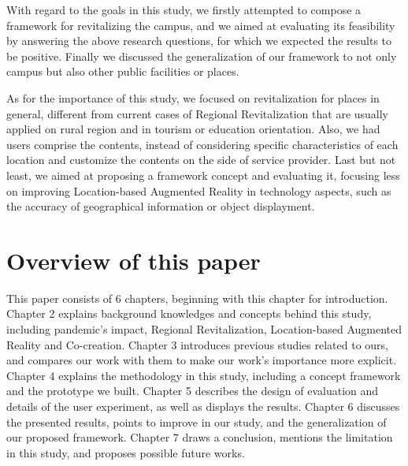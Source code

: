 
With regard to the goals in this study, we firstly attempted to compose a framework for revitalizing the campus, and we aimed at evaluating its feasibility by answering the above research questions, for which we expected the results to be positive.
Finally we discussed the generalization of our framework to not only campus but also other public facilities or places.


As for the importance of this study, we focused on revitalization for places in general, different from current cases of Regional Revitalization that are usually applied on rural region and in tourism or education orientation.
Also, we had users comprise the contents, instead of considering specific characteristics of each location and customize the contents on the side of service provider.
Last but not least, we aimed at proposing a framework concept and evaluating it, focusing less on improving Location-based Augmented Reality in technology aspects, such as the accuracy of geographical information or object displayment.

\section{Overview of this paper}
This paper consists of 6 chapters, beginning with this chapter for introduction.
Chapter 2 explains background knowledges and concepts behind this study, including pandemic's impact, Regional Revitalization, Location-based Augmented Reality and Co-creation.
Chapter 3 introduces previous studies related to ours, and compares our work with them to make our work's importance more explicit.
Chapter 4 explains the methodology in this study, including a concept framework and the prototype we built.
Chapter 5 describes the design of evaluation and details of the user experiment, as well as displays the results.
Chapter 6 discusses the presented results, points to improve in our study, and the generalization of our proposed framework.
Chapter 7 draws a conclusion, mentions the limitation in this study, and proposes possible future works.

